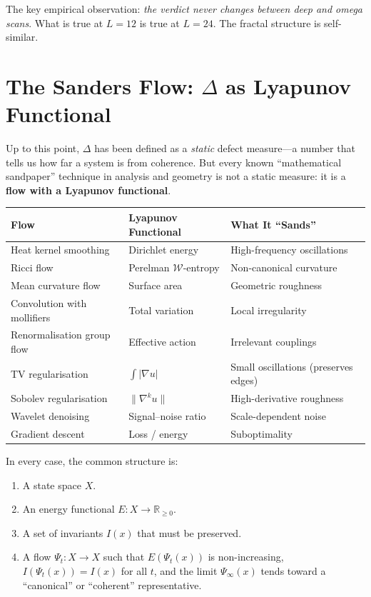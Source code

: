\documentclass[12pt, openany]{book}
\theoremstyle{remark}
\begin{document}
The key empirical observation: \emph{the verdict never changes between deep and omega
scans}. What is true at $L = 12$ is true at $L = 24$. The fractal structure is
self-similar.

\section{The Sanders Flow: $\Delta$ as Lyapunov Functional}
\label{sec:sanders-flow}

Up to this point, $\Delta$ has been defined as a \emph{static} defect measure---a number
that tells us how far a system is from coherence.  But every known ``mathematical
sandpaper'' technique in analysis and geometry is not a static measure: it is a
\textbf{flow with a Lyapunov functional}.

\begin{center}
\begin{tabular}{@{}lll@{}}
\toprule
\textbf{Flow} & \textbf{Lyapunov Functional} & \textbf{What It ``Sands''} \\
\midrule
Heat kernel smoothing & Dirichlet energy & High-frequency oscillations \\
Ricci flow & Perelman $\mathcal{W}$-entropy & Non-canonical curvature \\
Mean curvature flow & Surface area & Geometric roughness \\
Convolution with mollifiers & Total variation & Local irregularity \\
Renormalisation group flow & Effective action & Irrelevant couplings \\
TV regularisation & $\int|\nabla u|$ & Small oscillations (preserves edges) \\
Sobolev regularisation & $\|\nabla^k u\|$ & High-derivative roughness \\
Wavelet denoising & Signal--noise ratio & Scale-dependent noise \\
Gradient descent & Loss / energy & Suboptimality \\
\bottomrule
\end{tabular}
\end{center}

\noindent
In every case, the common structure is:
\begin{enumerate}
  \item A state space $X$.
  \item An energy functional $E : X \to \mathbb{R}_{\geq 0}$.
  \item A set of invariants $I(x)$ that must be preserved.
  \item A flow $\Psi_t : X \to X$ such that $E(\Psi_t(x))$ is non-increasing,
        $I(\Psi_t(x)) = I(x)$ for all $t$, and the limit $\Psi_\infty(x)$ tends
        toward a ``canonical'' or ``coherent'' representative.
\end{enumerate}
\end{document}
